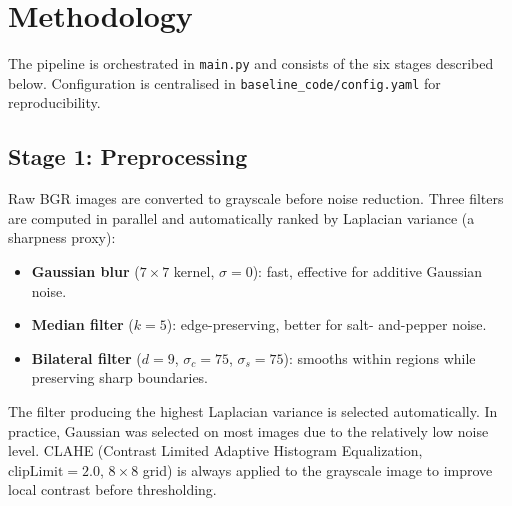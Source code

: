 \documentclass[12pt,a4paper]{article}
\begin{document}
\newpage

\section{Methodology}

The pipeline is orchestrated in \texttt{main.py} and consists of the six
stages described below. Configuration is centralised in
\texttt{baseline\_code/config.yaml} for reproducibility.

\subsection{Stage 1: Preprocessing}

Raw BGR images are converted to grayscale before noise reduction. Three
filters are computed in parallel and automatically ranked by Laplacian
variance (a sharpness proxy):

\begin{itemize}
    \item \textbf{Gaussian blur} ($7 \times 7$ kernel, $\sigma = 0$): fast,
          effective for additive Gaussian noise.
    \item \textbf{Median filter} ($k = 5$): edge-preserving, better for salt-
          and-pepper noise.
    \item \textbf{Bilateral filter} ($d = 9$, $\sigma_c = 75$, $\sigma_s = 75$):
          smooths within regions while preserving sharp boundaries.
\end{itemize}

The filter producing the highest Laplacian variance is selected automatically.
In practice, Gaussian was selected on most images due to the relatively low
noise level. CLAHE (Contrast Limited Adaptive Histogram Equalization,
$\text{clipLimit}=2.0$, $8 \times 8$ grid) is always applied to the grayscale
image to improve local contrast before thresholding.
\end{document}
